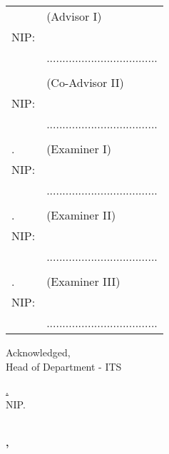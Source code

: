 \noindent
\begin{tabularx}{\textwidth}{X l}
  \advisor{}               & (Advisor I)                         \\
  NIP: \advisornip{}       &                                     \\
                           & ................................... \\
                           &                                     \\
  \coadvisor{}             & (Co-Advisor II)                     \\
  NIP: \coadvisornip{}     &                                     \\
                           & ................................... \\
                           &                                     \\
  \examinerone{}.          & (Examiner I)                        \\
  NIP: \examineronenip{}   &                                     \\
                           & ................................... \\
                           &                                     \\
  \examinertwo{}.          & (Examiner II)                       \\
  NIP: \examinertwonip{}   &                                     \\
                           & ................................... \\
                           &                                     \\
  \examinerthree{}.        & (Examiner III)                      \\
  NIP: \examinerthreenip{} &                                     \\
                           & ................................... \\
\end{tabularx}
\endgroup


\begin{center}
  Acknowledged, \\
  Head of \engdepartment{} Department \engfacultyshort{} - ITS \\

  \vspace{8ex}

  \underline{\headofdepartment{}.} \\
  NIP. \headofdepartmentnip{}
\end{center}

\begin{center}
  \textbf{\MakeUppercase{\place{}}\\\ENGMONTH{}, \the\year{}}
\end{center}
\endgroup
